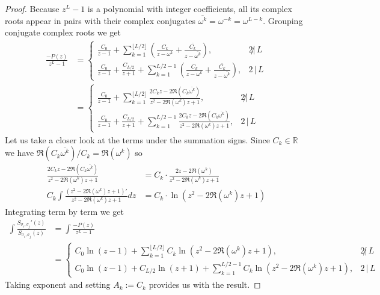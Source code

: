 \documentclass[oneside]{amsart}
\def\R{\mathbb{R}}
\begin{document}
\begin{proof}
  Because $z^L-1$ is a polynomial with integer coefficients, all its complex roots appear in pairs
  with their complex conjugates $\overline{\omega^k} = \omega^{-k} = \omega^{L-k}$.
  Grouping conjugate complex roots we get
  \begin{align*}
    \frac{-P(z)}{z^L-1} &= \begin{cases}
      \frac{C_0}{z-1} + \sum_{k=1}^{\lfloor L/2 \rfloor} \left( \frac{C_k}{z-\omega^k} + \frac{\overline{C_k}}{z-\overline{\omega^k}} \right), & 2 \!\not|\, L \\[2ex]
      \frac{C_0}{z-1} + \frac{C_{L/2}}{z+1} + \sum_{k=1}^{L/2-1} \left( \frac{C_k}{z-\omega^k} + \frac{\overline{C_k}}{z-\overline{\omega^k}} \right), & 2 \,|\, L
    \end{cases} \\[2ex]
    &= \begin{cases}
      \frac{C_0}{z-1} + \sum_{k=1}^{\lfloor L/2 \rfloor} \frac{2C_kz-2\Re(C_k\overline{\omega^k})}{z^2-2\Re(\omega^k)z+1}, & 2 \!\not|\, L \\[2ex]
      \frac{C_0}{z-1} + \frac{C_{L/2}}{z+1} + \sum_{k=1}^{L/2-1} \frac{2C_kz-2\Re(C_k\overline{\omega^k})}{z^2-2\Re(\omega^k)z+1}, & 2 \,|\, L
    \end{cases}
  \end{align*}
  Let us take a closer look at the terms under the summation signs.
  Since $C_k \in \R$ we have $\Re(C_k\overline{\omega^k})/C_k = \Re(\omega^k)$
  so
  \begin{align*}
    \frac{2C_kz-2\Re(C_k\overline{\omega^k})}{z^2-2\Re(\omega^k)z+1}
      &= C_k \cdot \frac{2z-2\Re(\omega^k)}{z^2 -2\Re(\omega^k)z +1} \\
    C_k \int \frac{\left( z^2 -2\Re(\omega^k)z +1 \right)'}{z^2-2\Re(\omega^k)z+1} dz
      &= C_k \cdot \ln \left( z^2-2\Re(\omega^k)z+1 \right)
  \end{align*}
  Integrating term by term we get
  \begin{align*}
    \int \frac{S_{\sigma_i, \sigma_j}'(z)}{S_{\sigma_i, \sigma_j}(z)}
      &= \int \frac{-P(z)}{z^L-1} \\
    &= \begin{cases}
      C_0\ln(z-1) + \sum_{k=1}^{\lfloor L/2 \rfloor} C_k \ln \left( z^2-2\Re(\omega^k)z+1 \right)  , & 2 \!\not|\, L \\[2ex]
       C_0\ln(z-1) + C_{L/2}\ln(z+1) + \sum_{k=1}^{L/2-1} C_k \ln \left( z^2-2\Re(\omega^k)z+1 \right) , & 2 \,|\, L
    \end{cases}
  \end{align*}
  Taking exponent and setting $A_k := C_k$ provides us with the result.
\end{proof}
\end{document}
